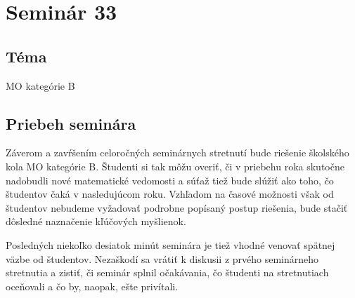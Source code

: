 \section*{Seminár 33}
\subsection*{Téma}
MO kategórie B

\subsection{Priebeh seminára}
Záverom a zavŕšením celoročných seminárnych stretnutí bude riešenie školského kola MO kategórie B. Študenti si tak môžu overiť, či v priebehu roka skutočne nadobudli nové matematické vedomosti a súťaž tiež bude slúžiť ako  toho, čo študentov čaká v nasledujúcom roku. Vzhľadom na časové možnosti však od študentov nebudeme vyžadovať podrobne popísaný postup riešenia, bude stačiť dôsledné naznačenie kľúčových myšlienok.

Posledných niekoľko desiatok minút seminára je tiež vhodné venovať spätnej väzbe od študentov. Nezaškodí sa vrátiť k diskusii z prvého seminárneho stretnutia a zistiť, či seminár splnil očakávania, čo študenti na stretnutiach oceňovali a čo by, naopak, ešte privítali.
